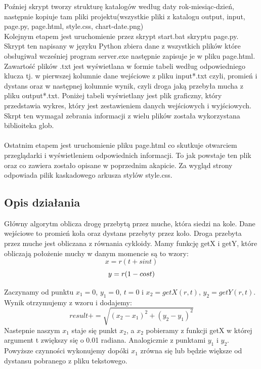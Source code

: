 \documentclass[12pt,a4paper]{article}
\begin{document}
Poźniej skrypt tworzy strukturę katalogów według daty rok-miesiąc-dzień, następnie kopiuje tam pliki projektu(wszystkie pliki z katalogu output, input, page.py, page.html, style.css, chart-date.png)\\

Kolejnym etapem jest uruchomienie przez skrypt start.bat skryptu page.py. Skrypt ten napisany w języku Python zbiera dane z wszystkich plików które obsługiwał wcześniej program server.exe następnie zapisuje je w pliku page.html. Zawartość plików .txt jest wyświetlana w formie tabeli według odpowiedniego klucza tj. w pierwszej kolumnie dane wejściowe z pliku input*.txt czyli, promień i dystans oraz w następnej kolumnie wynik, czyli droga jaką przebyła mucha z pliku output*.txt. Poniżej tabeli wyświetlany jest plik graficzny, który przedstawia wykres, który jest zestawieniem danych wejściowych i wyjściowych. Skrpt ten wymagał zebrania informacji z wielu plików została wykorzystana biblioiteka glob.\\


\\Ostatnim etapem jest uruchomienie pliku page.html co skutkuje otwarciem przeglądarki i wyświetleniem odpowiednich informacji. To jak powstaje ten plik oraz co zawiera zostało opisane w poprzednim akapicie. Za wygląd strony odpowiada pilik kaskadowego arkusza stylów style.css.  

	\newpage
	\subsection*{Opis działania} 
Główny algorytm oblicza drogę przebytą przez muche, która siedzi na kole. Dane wejściowe to promień koła oraz dystans przebyty przez koło. Droga przebyta przez muche jest obliczana z równania cykloidy.
Mamy funkcję getX i getY, które obliczają położenie muchy w danym momencie są to wzory:
$$x = r(t + sint)$$
$$y = r(1 - cost)\\$$

Zaczynamy od punktu $x_1=0$, $y_1=0$, $t=0$ i $x_2=getX(r, t)$, $y_2=getY(r, t)$. \\Wynik otrzymujemy z wzoru i dodajemy:
$$result+= \sqrt{(x_2-x_1)^2 + (y_2-y_1)^2}$$
Nastepnie naszym $x_1$ staje się punkt $x_2$, a $x_2$ pobieramy z funkcji getX w której argument t zwiększy się o 0.01 radiana. Analogicznie z punktami $y_1$ i $y_2$. Powyższe czynności wykonujemy dopóki $x_1$ zrówna się lub będzie większe od dystansu pobranego z pliku tekstowego.
\end{document}
